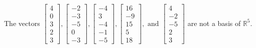 \begin{exercise}
\begin{exerciseStatement}
  \end{exerciseStatement}
  \begin{exerciseAnswer}
   The vectors \(\left[\begin{array}{r}
4 \\
0 \\
3 \\
2 \\
3
\end{array}\right] , \left[\begin{array}{r}
-2 \\
-3 \\
-5 \\
0 \\
-3
\end{array}\right] , \left[\begin{array}{r}
-4 \\
3 \\
-4 \\
-1 \\
-5
\end{array}\right] , \left[\begin{array}{r}
16 \\
-9 \\
15 \\
5 \\
18
\end{array}\right] , \text{ and } \left[\begin{array}{r}
4 \\
-2 \\
-5 \\
2 \\
3
\end{array}\right]\) 
  	 are not  a basis of \(\mathbb{R}^5\).
  


  \end{exerciseAnswer}
\end{exercise}